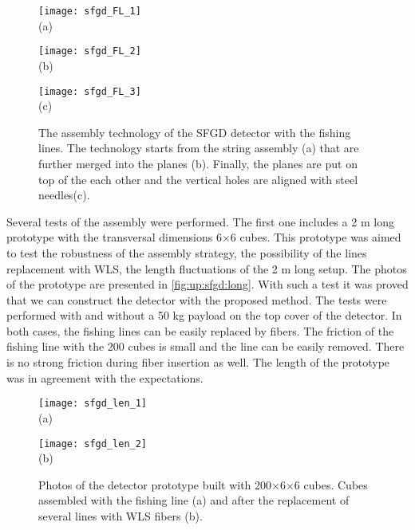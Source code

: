 \documentclass[main.tex]{subfiles}
\begin{document}
\begin{figure}[!ht]
	\centering
  \begin{minipage}{0.33\linewidth}
    \centering
    \texttt{[image: sfgd\_FL\_1]} \\ (a)
  \end{minipage}
  \begin{minipage}{0.33\linewidth}
    \centering
    \texttt{[image: sfgd\_FL\_2]} \\ (b)
  \end{minipage}
  \begin{minipage}{0.33\linewidth}
    \centering
    \texttt{[image: sfgd\_FL\_3]} \\ (c)
  \end{minipage}
  \caption{The assembly technology of the SFGD detector with the fishing lines. The technology starts from the string assembly (a) that are further merged into the planes (b). Finally, the planes are put on top of the each other and the vertical holes are aligned with steel needles(c).}
  \label{fig:up:sfgd:string}
\end{figure}

Several tests of the assembly were performed. The first one includes a 2 m long prototype with the transversal dimensions 6$\times$6 cubes. This prototype was aimed to test the robustness of the assembly strategy, the possibility of the lines replacement with WLS, the length fluctuations of the 2 m long setup. The photos of the prototype are presented in \autoref{fig:up:sfgd:long}. With such a test it was proved that we can construct the detector with the proposed method. The tests were performed with and without a 50 kg payload on the top cover of the detector. In both cases, the fishing lines can be easily replaced by fibers. The friction of the fishing line with the 200 cubes is small and the line can be easily removed. There is no strong friction during fiber insertion as well. The length of the prototype was in agreement with the expectations.

\begin{figure}[!ht]
	\centering
  \begin{minipage}{0.49\linewidth}
    \centering
    \texttt{[image: sfgd\_len\_1]} \\ (a)
  \end{minipage}
  \begin{minipage}{0.49\linewidth}
    \centering
    \texttt{[image: sfgd\_len\_2]} \\ (b)
  \end{minipage}
  \caption{Photos of the detector prototype built with 200$\times$6$\times$6 cubes. Cubes assembled with the fishing line (a) and after the replacement of several lines with WLS fibers (b).}
  \label{fig:up:sfgd:long}
\end{figure}
\end{document}
